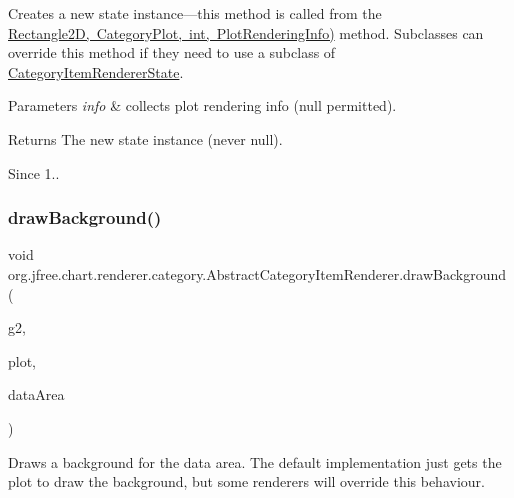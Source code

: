 Creates a new state instance---this method is called from the \mbox{\hyperlink{}{Rectangle2D, Category\+Plot, int, Plot\+Rendering\+Info)}} method. Subclasses can override this method if they need to use a subclass of \mbox{\hyperlink{classorg_1_1jfree_1_1chart_1_1renderer_1_1category_1_1_category_item_renderer_state}{Category\+Item\+Renderer\+State}}.


\begin{DoxyParams}{Parameters}
{\em info} & collects plot rendering info ({\ttfamily null} permitted).\\
\hline
\end{DoxyParams}
\begin{DoxyReturn}{Returns}
The new state instance (never {\ttfamily null}).
\end{DoxyReturn}
\begin{DoxySince}{Since}
1.. 
\end{DoxySince}
\mbox{\label{classorg_1_1jfree_1_1chart_1_1renderer_1_1category_1_1_abstract_category_item_renderer_a361e049bc6eafacf1b6cf705e932d620}} 
\subsubsection{\texorpdfstring{draw\+Background()}{drawBackground()}}
{\footnotesize\ttfamily void org.\+jfree.\+chart.\+renderer.\+category.\+Abstract\+Category\+Item\+Renderer.\+draw\+Background (\begin{DoxyParamCaption}\item[{Graphics2D}]{g2,  }\item[{\mbox{\hyperlink{classorg_1_1jfree_1_1chart_1_1plot_1_1_category_plot}{Category\+Plot}}}]{plot,  }\item[{Rectangle2D}]{data\+Area }\end{DoxyParamCaption})}

Draws a background for the data area. The default implementation just gets the plot to draw the background, but some renderers will override this behaviour.


